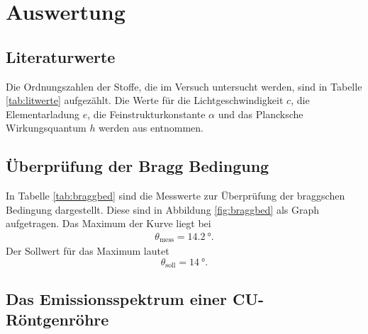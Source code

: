 \section{Auswertung}
\label{sec:Auswertung}

\subsection{Literaturwerte}

Die Ordnungszahlen der Stoffe, die im Versuch untersucht werden, sind in
Tabelle \ref{tab:litwerte} aufgezählt.
Die Werte für die Lichtgeschwindigkeit $c$, die Elementarladung $e$, die
Feinstrukturkonstante $\alpha$ und das Plancksche Wirkungsquantum $h$ werden aus
\cite{Codata} entnommen.

\subsection{Überprüfung der Bragg Bedingung}

In Tabelle \ref{tab:braggbed} sind die Messwerte zur Überprüfung der braggschen
Bedingung dargestellt. Diese sind in Abbildung \ref{fig:braggbed} als Graph
aufgetragen.
Das Maximum der Kurve liegt bei
\begin{align}
  \theta_\text{mess} = \SI{14.2}{\degree}.
\end{align}
Der Sollwert für das Maximum lautet
\begin{equation}
  \theta_\text{soll} = \SI{14}{\degree}.
\end{equation}

\subsection{Das Emissionsspektrum einer CU-Röntgenröhre}

